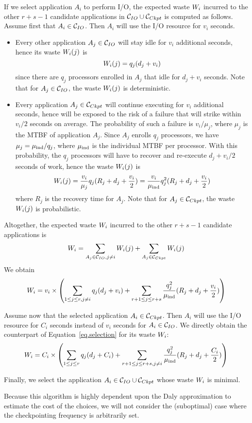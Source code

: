If we select application $A_{i}$ to perform I/O,  the expected waste $W_{i}$ incurred
to the other $r+s-1$ candidate applications in  $\mathcal{C}_{IO} \cup \mathcal{C}_{Ckpt}$ is computed as follows.
Assume first that $A_{i} \in \mathcal{C}_{IO}$. Then  $A_{i}$ will use the I/O resource for $v_{i}$ seconds.
\begin{itemize}
  \item Every other application $A_{j} \in \mathcal{C}_{IO}$ will stay idle for $v_{i}$ additional seconds,
  hence its waste $W_{i}(j)$ is
  $$W_{i}(j) = q_{j} (d_{j} + v_{i})$$
  since there are $q_{j}$ processors enrolled in $A_{j}$ that idle for $d_{j} + v_{i}$ seconds. Note that for $A_{j} \in \mathcal{C}_{IO}$, the waste $W_{i}(j)$ is deterministic.
  \item Every application $A_{j} \in \mathcal{C}_{Ckpt}$ will continue executing for $v_{i}$ additional seconds, hence will be exposed to the risk of a failure that will strike within $v_{i}/2$ seconds on average. The probability of such a failure is $v_{i}/\mu_{j}$, where $\mu_{j}$ is the
  MTBF of application $A_{j}$. Since $A_{j}$ enrolls $q_{j}$ processors, we have $\mu_{j} = \mu_{\text{ind}}/q_{j}$, where $\mu_{\text{ind}}$ is the individual MTBF per processor. With this probability,
  the $q_{j}$ processors will have to recover and re-execute $d_{j} + v_{i}/2$ seconds of work,
  hence the waste $W_{i}(j)$ is
     $$W_{i}(j) = \frac{v_{i}}{\mu_{j} } q_{j} (R_{j} + d_{j} + \frac{v_{i}}{2}) =
     \frac{v_{i}}{\mu_{\text{ind}}} q^{2}_{j} (R_{j} + d_{j} + \frac{v_{i}}{2})$$
     where $R_{j}$ is the recovery time for $A_{j}$.
Note that for $A_{j} \in \mathcal{C}_{Ckpt}$, the waste $W_{i}(j)$ is probabilistic.
 \end{itemize}
 Altogether, the expected waste $W_{i}$ incurred
to the other $r+s-1$ candidate applications is
$$W_{i} = \sum_{A_{j} \in \mathcal{C}_{IO}, j\neq i} W_{i}(j) + \sum_{A_{j} \in \mathcal{C}_{Ckpt}} W_{i}(j)$$
We obtain
\begin{equation}
\label{eq.selection}
 W_{i} = v_{i} \times \left( \sum_{1 \leq j \leq r, j\neq i} q_{j} (d_{j} + v_{i})
 + \sum_{r+1 \leq j \leq r+s}   \frac{q^{2}_{j}}{\mu_{\text{ind}}} (R_{j} + d_{j} + \frac{v_{i}}{2}) \right)
\end{equation}

 Assume now that the selected application $A_{i} \in \mathcal{C}_{Ckpt}$. Then  $A_{i}$ will use the I/O resource for $C_{i}$ seconds instead of $v_{i}$ seconds for $A_{i} \in \mathcal{C}_{IO}$. We directly obtain the counterpart of Equation~\eqref{eq.selection} for its waste $W_{i}$:
 \begin{equation}
\label{eq.selection2}
 W_{i} = C_{i} \times \left( \sum_{1 \leq j \leq r} q_{j} (d_{j} + C_{i})
 + \sum_{r+1 \leq j \leq r+s, j\neq i}   \frac{q^{2}_{j}}{\mu_{\text{ind}}} (R_{j} + d_{j} + \frac{C_{i}}{2}) \right)
\end{equation}

 Finally, we select the application $A_{i} \in \mathcal{C}_{IO} \cup \mathcal{C}_{Ckpt}$ whose waste
 $W_{i}$ is minimal.

Because this algorithm is highly dependent upon the Daly approximation to
estimate the cost of the choices, we will not consider the (suboptimal)
case where the checkpointing frequency is arbitrarily set.
